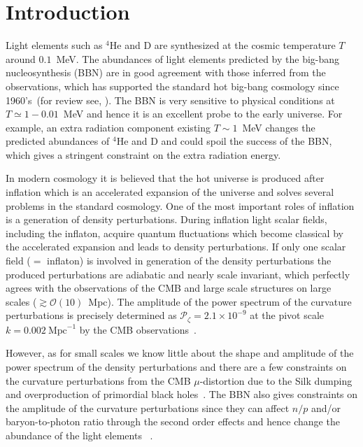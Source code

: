 \documentclass[11pt,a4paper]{article}
\begin{document}

\section{Introduction}

Light elements such as $^4$He and D are synthesized at the cosmic temperature $T$ around $0.1$~MeV. 
The abundances of light elements predicted by the big-bang nucleosynthesis (BBN) are in good agreement with those inferred from the observations, which has supported the standard hot big-bang cosmology since 1960's~(for review see, \cite{Iocco:2008va}).
The BBN is very sensitive to physical conditions at $T\simeq 1-0.01$~MeV and hence it is an excellent probe to the early universe.
For example, an extra radiation component existing $T\sim 1$~MeV changes the predicted abundances of $^4$He and D and could spoil the success of the BBN, which gives a stringent constraint on the extra radiation energy.

In modern cosmology it is believed that the hot universe is produced after inflation which is an accelerated expansion of the universe and solves several problems in the standard cosmology. 
One of the most important roles of inflation is a generation of density perturbations. 
During inflation light scalar fields, including the inflaton, acquire quantum fluctuations which become classical by the accelerated expansion and leads to density perturbations.
If only one scalar field ($=$ inflaton) is involved in generation of the density perturbations the produced perturbations are adiabatic and nearly scale invariant, which perfectly agrees with the observations of the CMB and large scale structures on large scales ($ \gtrsim \mathcal{O}(10)$~Mpc).
The amplitude of the power spectrum of the curvature perturbations is precisely determined as $\mathcal{P}_\zeta = 2.1\times 10^{-9}$ at the pivot scale $k=0.002~\text{Mpc}^{-1}$ by the CMB observations~\cite{Ade:2015xua}.

However, as for small scales we know little about the shape and amplitude of the power spectrum of the density perturbations and there are a few constraints on the curvature perturbations from the CMB $\mu$-distortion due to the Silk dumping~\cite{Chluba:2013dna} and overproduction of primordial black holes~\cite{Carr:2009jm}. 
The BBN also gives constraints on the amplitude of the curvature perturbations since they can affect $n/p$ and/or baryon-to-photon ratio through the second order effects and hence change the abundance of the light elements~\cite{Jeong:2014gna,Nakama:2014vla,Inomata:2016uip} .
\end{document}
